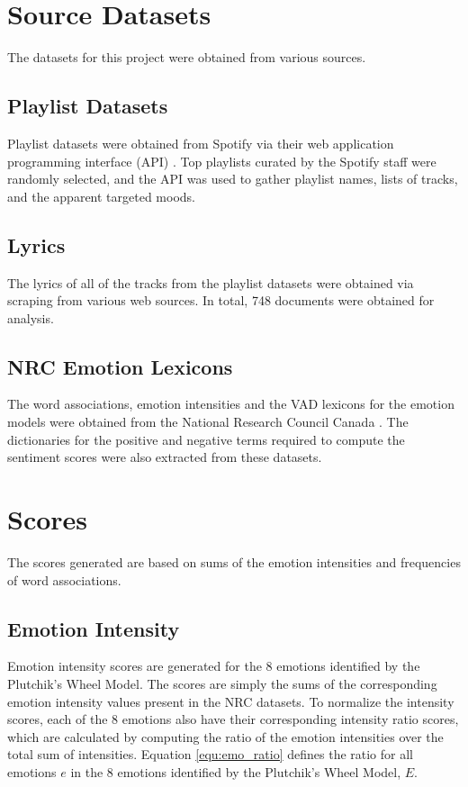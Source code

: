 \documentclass[11pt]{article}
\begin{document}
\section{Source Datasets}

The datasets for this project were obtained from various sources.

\subsection{Playlist Datasets}

Playlist datasets were obtained from Spotify via their web application programming interface (API) \cite{spotify}. Top playlists curated by the Spotify staff were randomly selected, and the API was used to gather playlist names, lists of tracks, and the apparent targeted moods.

\subsection{Lyrics}

The lyrics of all of the tracks from the playlist datasets were obtained via scraping from various web sources. In total, 748 documents were obtained for analysis.

\subsection{NRC Emotion Lexicons}

The word associations, emotion intensities and the VAD lexicons for the emotion models were obtained from the National Research Council Canada \cite{LREC18-AIL,Mohammad13,vad-acl2018}. The dictionaries for the positive and negative terms required to compute the sentiment scores were also extracted from these datasets.

\section{Scores}

The scores generated are based on sums of the emotion intensities and frequencies of word associations.

\subsection{Emotion Intensity}

Emotion intensity scores are generated for the 8 emotions identified by the Plutchik's Wheel Model. The scores are simply the sums of the corresponding emotion intensity values present in the NRC datasets. To normalize the intensity scores, each of the 8 emotions also have their corresponding intensity ratio scores, which are calculated by computing the ratio of the emotion intensities over the total sum of intensities. Equation \ref{equ:emo_ratio} defines the ratio for all emotions $e$ in the 8 emotions identified by the Plutchik's Wheel Model, $E$.
\end{document}
